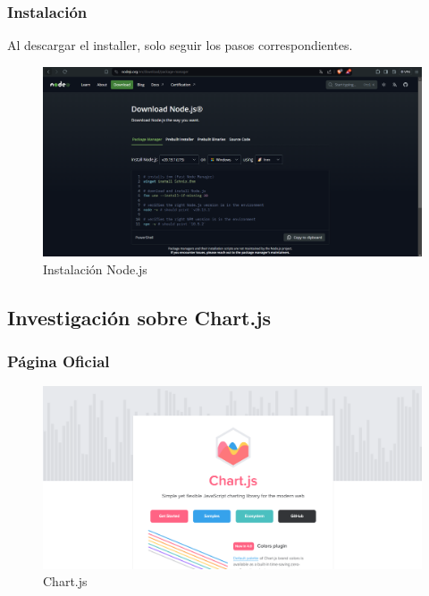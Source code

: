 \documentclass{article}
\begin{document}
	\subsubsection{Instalación}
	Al descargar el installer, solo seguir los pasos correspondientes.
	\begin{figure}[H]
		\centering
		\includegraphics[width=1\textwidth,keepaspectratio]{img/node.png}
		\caption{Instalación Node.js}
	\end{figure}
	\subsection{Investigación sobre Chart.js}
	\subsubsection{Página Oficial}
	\begin{figure}[H]
		\centering
		\includegraphics[width=1\textwidth,keepaspectratio]{img/Chart_O.png}
		\caption{Chart.js}
	\end{figure}
\end{document}
